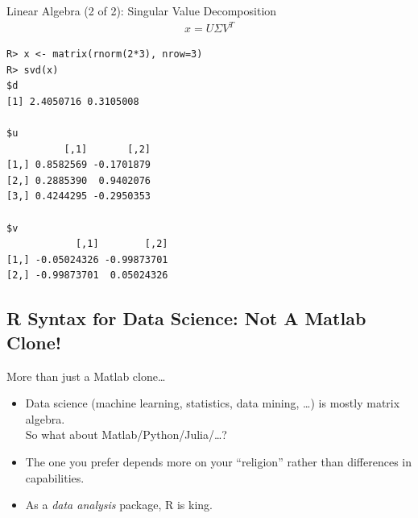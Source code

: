 \begin{frame}
  \begin{exampleblock}{Linear Algebra (2 of 2): Singular Value Decomposition}\pause
  \begin{align*}
    x = U\Sigma V^T
  \end{align*}
\begin{lstlisting}[backgroundcolor=\color{white},basicstyle=\ttfamily\color{dkgray}\scriptsize,keywordstyle=\color{black}, 
  commentstyle=\color{orange},stringstyle=\color{mauve}]
R> x <- matrix(rnorm(2*3), nrow=3)
R> svd(x)
$d
[1] 2.4050716 0.3105008

$u
          [,1]       [,2]
[1,] 0.8582569 -0.1701879
[2,] 0.2885390  0.9402076
[3,] 0.4244295 -0.2950353

$v
            [,1]        [,2]
[1,] -0.05024326 -0.99873701
[2,] -0.99873701  0.05024326

\end{lstlisting} %
  \end{exampleblock}
\end{frame}





\subsection{R Syntax for Data Science:  Not A Matlab Clone!}

\begin{frame}
  \begin{block}{More than just a Matlab clone\dots}\pause
  \begin{itemize}[<+-|alert@+>]
    \item Data science (machine learning, statistics, data mining, \dots) is mostly matrix algebra.  \\[.2cm]
     So what about Matlab/Python/Julia/\dots ?
    \item The one you prefer depends more on your ``religion'' rather than differences in capabilities.
    \item As a \emph{data analysis} package, R is king.
  \end{itemize}
\end{block}
\end{frame}


